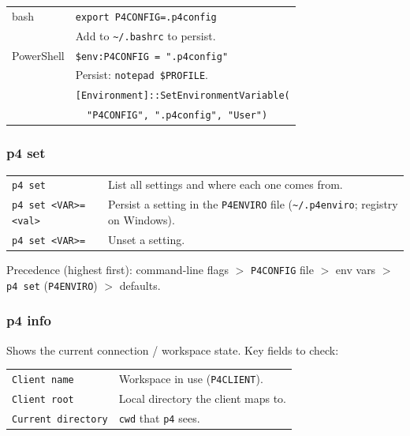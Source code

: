 \begin{tabularx}{\linewidth}{lX}
    bash    & \texttt{export P4CONFIG=.p4config}\\
            & Add to \texttt{\textasciitilde{}/.bashrc} to persist.\\
\hline
    PowerShell
            & \texttt{\$env:P4CONFIG = ".p4config"}\\
            & Persist: \texttt{notepad \$PROFILE}.\\
            & \texttt{[Environment]::SetEnvironmentVariable(}\\
            & \texttt{~~"P4CONFIG", ".p4config", "User")}\\
\hline
\end{tabularx}


\subsubsection*{p4 set}

\begin{tabularx}{\linewidth}{lX}
    \texttt{p4 set} & List all settings and where each one comes
                        from.\\
    \texttt{p4 set <VAR>=<val>}
                    & Persist a setting in the \texttt{P4ENVIRO}
                        file
                        (\texttt{\textasciitilde{}/.p4enviro};
                        registry on Windows).\\
    \texttt{p4 set <VAR>=} & Unset a setting.\\
\hline
\end{tabularx}

Precedence (highest first): command-line flags $>$
\texttt{P4CONFIG} file $>$ env vars $>$ \texttt{p4 set}
(\texttt{P4ENVIRO}) $>$ defaults.


\subsubsection*{p4 info}

Shows the current connection / workspace state. Key fields to check:

\begin{tabularx}{\linewidth}{lX}
    \texttt{Client name}       & Workspace in use (\texttt{P4CLIENT}).\\
    \texttt{Client root}       & Local directory the client maps to.\\
    \texttt{Current directory} & \texttt{cwd} that \texttt{p4} sees.\\
\hline
\end{tabularx}


